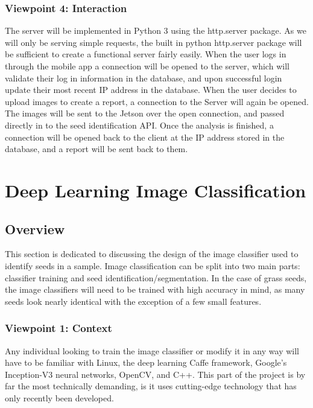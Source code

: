 \documentclass[onecolumn, draftclsnofoot,10pt, compsoc]{IEEEtran}
\begin{document}
        \subsubsection{Viewpoint 4: Interaction}
        	The server will be implemented in Python 3 using the http.server package.
            As we will only be serving simple requests, the built in python http.server package will be sufficient to create a functional server fairly easily.
            When the user logs in through the mobile app a connection will be opened to the server, which will validate their log in information in the database, and upon successful login update their most recent IP address in the database.
            When the user decides to upload images to create a report, a connection to the Server will again be opened.
            The images will be sent to the Jetson over the open connection, and passed directly in to the seed identification API.
            Once the analysis is finished, a connection will be opened back to the client at the IP address stored in the database, and a report will be sent back to them.

\section{Deep Learning Image Classification}
	\subsection{Overview}
    	This section is dedicated to discussing the design of the image classifier used to identify seeds in a sample. Image classification can be split into two main parts: classifier training and seed identification/segmentation. In the case of grass seeds, the image classifiers will need to be trained with high accuracy in mind, as many seeds look nearly identical with the exception of a few small features. 
    	\subsubsection{Viewpoint 1: Context}
        	Any individual looking to train the image classifier or modify it in any way will have to be familiar with Linux, the deep learning Caffe framework, Google's Inception-V3 neural networks, OpenCV, and C++. This part of the project is by far the most technically demanding, is it uses cutting-edge technology that has only recently been developed. 
\end{document}

